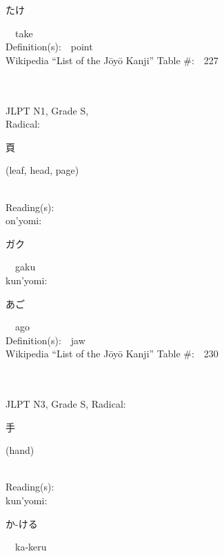 \begin{multicols}{2}
{\hspace*{2em}}{\begin{CJK}{UTF8}{min} たけ \end{CJK}}\ \ take\ \ \\
Definition(s):\ \ point \\
Wikipedia ``List of the J\=oy\=o Kanji'' Table \#:\ \ 227 \\
\ \ \\
{\fontsize{34pt}{40pt}  }\ \ \\
{JLPT N1, Grade S, \\Radical:\ \ {\begin{CJK}{UTF8}{min} 頁 \end{CJK}} (leaf, head, page) } \\
Reading(s):\ \ \\
{\hspace*{1em}}on'yomi:\ \ \\
{\hspace*{2em}}{\begin{CJK}{UTF8}{min} ガク \end{CJK}}\ \ gaku\ \ \\
{\hspace*{1em}}kun'yomi:\ \ \\
{\hspace*{2em}}{\begin{CJK}{UTF8}{min} あご \end{CJK}}\ \ ago\ \ \\
Definition(s):\ \ jaw \\
Wikipedia ``List of the J\=oy\=o Kanji'' Table \#:\ \ 230 \\
\ \ \\
{\fontsize{34pt}{40pt}  }\ \ \\  %
{JLPT N3, Grade S, Radical:\ \ {\begin{CJK}{UTF8}{min} 手 \end{CJK}} (hand) } \\
Reading(s):\ \ \\
{\hspace*{1em}}kun'yomi:\ \ \\
{\hspace*{2em}}{\begin{CJK}{UTF8}{min} か-ける \end{CJK}}\ \ ka-keru\ \ \\

\end{multicols}
